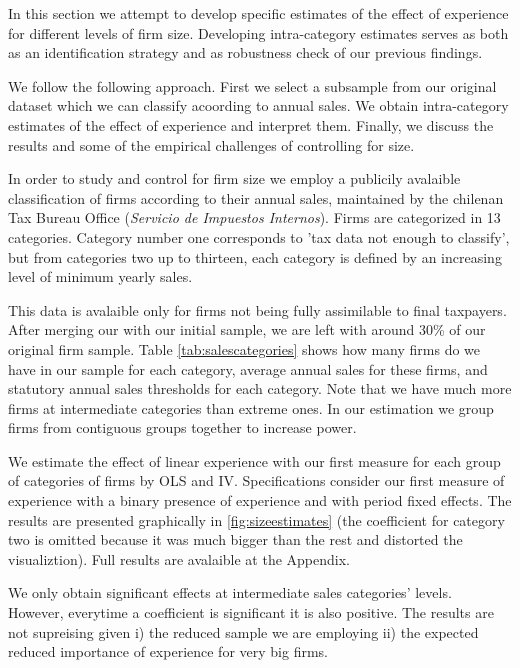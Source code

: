 In this section we attempt to develop specific estimates of the effect of experience for different levels of firm size. Developing intra-category estimates serves as both as an identification strategy and as  robustness check of our previous findings.

 We follow the following approach. First we select a subsample from our original dataset which we can classify acoording to annual sales.  We obtain intra-category estimates of the effect of experience and interpret them. Finally, we discuss the results and some of the empirical challenges of controlling for size.

In order to study and control for firm size we employ a publicily avalaible classification of firms according to their annual sales, maintained by the chilenan Tax Bureau Office (\textit{Servicio de Impuestos Internos}). Firms are categorized in 13 categories. Category number one  corresponds to 'tax data not enough to classify', but from categories two up to thirteen, each category is defined by an increasing level of minimum yearly sales.

This data is avalaible only for firms not being fully assimilable to final taxpayers. After merging our with our initial sample, we are left with around 30\% of our original firm sample. Table \ref{tab:salescategories} shows how many firms do we have in our sample for each category, average annual sales for these firms, and statutory annual sales thresholds for each category. Note that we have much more firms at intermediate categories than extreme ones. In our estimation we group firms from contiguous groups together to increase power.



We estimate the effect of linear experience with our first measure for each group of categories of firms by OLS and IV. Specifications consider our first measure of experience with a binary presence of experience and with period fixed effects. The results are presented graphically in \ref{fig:sizeestimates} (the coefficient for category two is omitted because it was much bigger than the rest and distorted the visualiztion). Full results are avalaible at the Appendix.

We only obtain significant effects at intermediate sales categories' levels. However, everytime a coefficient is significant it is also positive. The results are not supreising given i) the reduced sample we are employing ii) the expected reduced importance of experience for very big firms.

